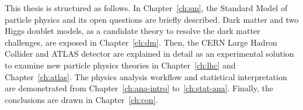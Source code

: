 \par This thesis is structured as follows. 
In Chapter~\ref{ch:sm}, the Standard Model of particle physics and its open questions are briefly described. Dark matter and two Higgs doublet models, as a candidate theory to resolve the dark matter challenges, are exposed in Chapter~\ref{ch:dm}. 
Then, the CERN Large Hadron Collider and ATLAS detector are explained in detail as an experimental solution to examine new particle physics theories in Chapter~\ref{ch:lhc} and Chapter~\ref{ch:atlas}. 
The physics analysis workflow and statistical interpretation are demonstrated from Chapter~\ref{ch:ana-intro} to~\ref{ch:stat-ana}. Finally, the conclusions are drawn in Chapter~\ref{ch:con}.
